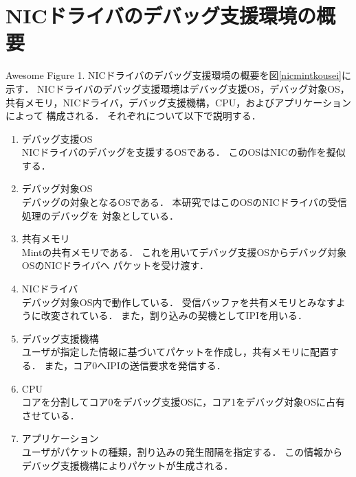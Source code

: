 \documentclass[tanilab-enum]{graduate}
\begin{document}
\section{NICドライバのデバッグ支援環境の概要}
{Awesome Figure 1.}
NICドライバのデバッグ支援環境の概要を図\ref{nicmintkousei}に示す．
NICドライバのデバッグ支援環境はデバッグ支援OS，デバッグ対象OS，
共有メモリ，NICドライバ，デバッグ支援機構，CPU，およびアプリケーションによって
構成される．
それぞれについて以下で説明する．
\begin{enumerate}
    \item デバッグ支援OS\\
        NICドライバのデバッグを支援するOSである．
        このOSはNICの動作を擬似する．
    \item デバッグ対象OS\\
        デバッグの対象となるOSである．
        本研究ではこのOSのNICドライバの受信処理のデバッグを
        対象としている．
    \item 共有メモリ\\
        Mintの共有メモリである．
        これを用いてデバッグ支援OSからデバッグ対象OSのNICドライバへ
        パケットを受け渡す．
    \item NICドライバ\\
        デバッグ対象OS内で動作している．
        受信バッファを共有メモリとみなすように改変されている．
        また，割り込みの契機としてIPIを用いる．
    \item デバッグ支援機構\\
        ユーザが指定した情報に基づいてパケットを作成し，共有メモリに配置する．
        また，コア0へIPIの送信要求を発信する．
    \item CPU\\
        コアを分割してコア0をデバッグ支援OSに，コア1をデバッグ対象OSに占有させている．
    \item アプリケーション\\
        ユーザがパケットの種類，割り込みの発生間隔を指定する．
        この情報からデバッグ支援機構によりパケットが生成される．
\end{enumerate}

\end{document}

